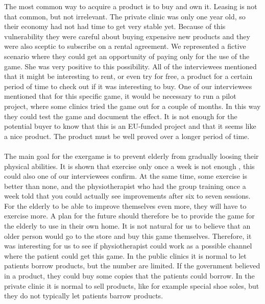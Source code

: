 The most common way to acquire a product is to buy and own it. Leasing is not that common, but not irrelevant. The private clinic was only one year old, so their economy had not had time to get very stable yet. Because of this vulnerability they were careful about buying expensive new products and they were also sceptic to subscribe on a rental agreement. We represented a fictive scenario where they could get an opportunity of paying only for the use of the game. She was very positive to this possibility. All of the interviewees mentioned that it might be interesting to rent, or even try for free, a product for a certain period of time to check out if it was interesting to buy.  One of our interviewees mentioned that for this specific game, it would be necessary to run a pilot project, where some clinics tried the game out for a couple of months. In this way they could test the game and document the effect. It is not enough for the potential buyer to know that this is an EU-funded project and that it seems like a nice product. The product must be well proved over a longer period of time. \\ \\
The main goal for the exergame is to prevent elderly from gradually loosing their physical abilities. It is shown that exercise only once a week is not enough \cite{gruppetrening-trheim}, this could also one of our interviewees confirm. At the same time, some exercise is better than none, and the physiotherapist who had the group training once a week told that you could actually see improvements after six to seven sessions. For the elderly to be able to improve themselves even more, they will have to exercise more. A plan for the future should therefore be to provide the game for the elderly to use in their own home. It is not natural for us to believe that an older person would go to the store and buy this game themselves. Therefore, it was interesting for us to see if physiotherapist could work as a possible channel where the patient could get this game. In the public clinics it is normal to let patients borrow products, but the number are limited.  If the government believed in a product, they could buy some copies that the patients could borrow. In the private clinic it is normal to sell products, like for example special shoe soles, but they do not typically let patients barrow products. \\ \\
